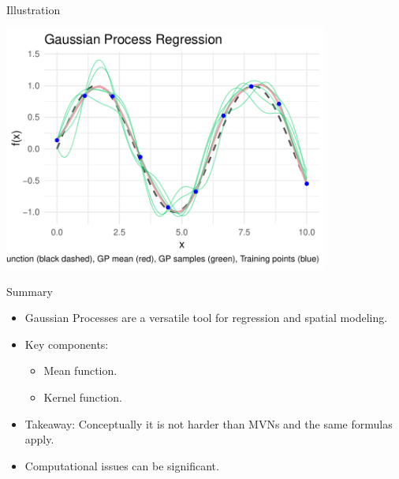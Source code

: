 \documentclass[11pt,handout,aspectratio=169]{beamer}
\begin{document}
%
%
%
%

\begin{frame}{Illustration}
	\begin{center}
		\includegraphics[width=0.8\textwidth]{pics/GP_nonpreg.pdf}
	\end{center}
\end{frame}

\begin{frame}{Summary}
\begin{itemize}
    \item Gaussian Processes are a versatile tool for regression and spatial modeling.\\[3mm]
    \item Key components:
    \begin{itemize}
        \item Mean function.
        \item Kernel function.\\[3mm]
    \end{itemize}
    \item Takeaway: Conceptually it is not harder than MVNs and the same formulas apply.\\[3mm]
    \item Computational issues can be significant.
\end{itemize}
\end{frame}
\end{document}
